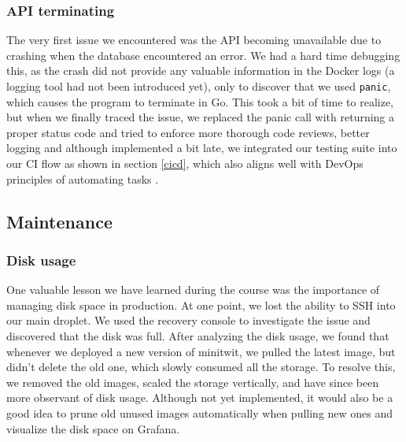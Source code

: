 \subsubsection{API terminating}
The very first issue we encountered was the API becoming unavailable due to crashing when the database encountered an error. We had a hard time debugging this, as the crash did not provide any valuable information in the Docker logs (a logging tool had not been introduced yet), only to discover that we used \texttt{panic}, which causes the program to terminate in Go. This took a bit of time to realize, but when we finally traced the issue, we replaced the panic call with returning a proper status code and tried to enforce more thorough code reviews, better logging and although implemented a bit late, we integrated our testing suite into our CI flow as shown in section \ref{cicd}, which also aligns well with DevOps principles of automating tasks \cite{devopsculture}.

\subsection{Maintenance}\label{maintainence}
\subsubsection{Disk usage}
One valuable lesson we have learned during the course was the importance of managing disk space in production. At one point, we lost the ability to SSH into our main droplet. We used the recovery console to investigate the issue and discovered that the disk was full. After analyzing the disk usage, we found that whenever we deployed a new version of minitwit, we pulled the latest image, but didn't delete the old one, which slowly consumed all the storage. To resolve this, we removed the old images, scaled the storage vertically, and have since been more observant of disk usage. Although not yet implemented, it would also be a good idea to prune old unused images automatically when pulling new ones and visualize the disk space on Grafana.
